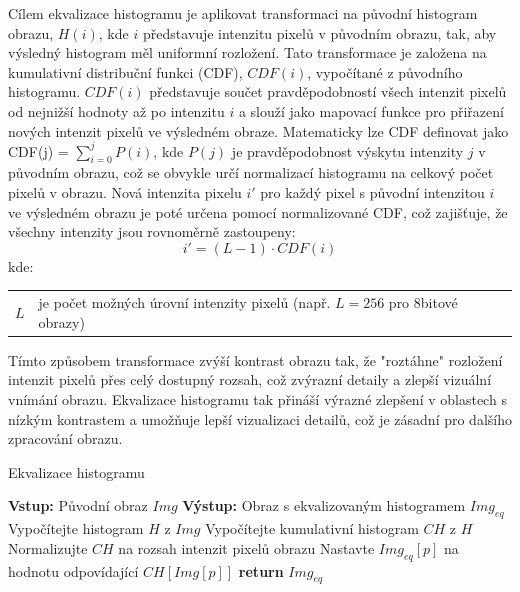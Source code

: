 \documentclass[male,czech,api_ing]{thesis}
\makeatletter
\newenvironment{conditions}[1][kde:]
    {#1 \begin{tabular}[t]{>{$}l<{$} @{${}={}$} >{\raggedright\arraybackslash}p{10cm}}}
    {\end{tabular}}
\makeatother
\begin{document}
Cílem ekvalizace histogramu je aplikovat transformaci na původní histogram obrazu, $H(i)$, kde $i$ představuje intenzitu pixelů v původním obrazu, tak, aby výsledný histogram měl uniformní rozložení. Tato transformace je založena na kumulativní distribuční funkci (CDF), $CDF(i)$, vypočítané z původního histogramu. $CDF(i)$ představuje součet pravděpodobností všech intenzit pixelů od nejnižší hodnoty až po intenzitu $i$ a slouží jako mapovací funkce pro přiřazení nových intenzit pixelů ve výsledném obraze. Matematicky lze CDF definovat jako CDF(j) = $\sum_{i=0}^{j} P(i)$, kde $P(j)$ je pravděpodobnost výskytu intenzity $j$ v původním obrazu, což se obvykle určí normalizací histogramu na celkový počet pixelů v obrazu. Nová intenzita pixelu $i'$ pro každý pixel s původní intenzitou $i$ ve výsledném obrazu je poté určena pomocí normalizované CDF, což zajišťuje, že všechny intenzity jsou rovnoměrně zastoupeny:
\begin{equation}
    i' = (L-1) \cdot CDF(i)
\end{equation}
\begin{conditions}
    L &  je počet možných úrovní intenzity pixelů (např. $L = 256$ pro 8bitové obrazy)
\end{conditions}
Tímto způsobem transformace zvýší kontrast obrazu tak, že "roztáhne" rozložení intenzit pixelů přes celý dostupný rozsah, což zvýrazní detaily a zlepší vizuální vnímání obrazu. Ekvalizace histogramu tak přináší výrazné zlepšení v oblastech s nízkým kontrastem a umožňuje lepší vizualizaci detailů, což je zásadní pro dalšího zpracování obrazu. \cite{ComputerVisionMetrics} \cite{ComputerVisionForX-RayTesting}

\begin{algorithm}
    \caption{Ekvalizace histogramu}
    \begin{algorithmic}[1]
        \State \textbf{Vstup:} Původní obraz $Img$
        \State \textbf{Výstup:} Obraz s ekvalizovaným histogramem $Img_{eq}$
        \State Vypočítejte histogram $H$ z $Img$
        \State Vypočítejte kumulativní histogram $CH$ z $H$
        \State Normalizujte $CH$ na rozsah intenzit pixelů obrazu
            \State Nastavte $Img_{eq}[p]$ na hodnotu odpovídající $CH[Img[p]]$
        \EndFor
        \State \textbf{return} $Img_{eq}$
    \end{algorithmic}
\end{algorithm}
\end{document}
